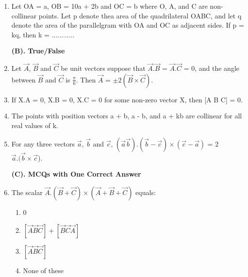 \begin{enumerate}[label=\arabic*.,ref=\thesubsection.\theenumi]
\item Let OA = a, OB = 10a + 2b and OC = b where O, A, and C are non-collinear points. Let p denote thea area of the quadrilateral OABC, and let q denote the area of the parallelgram with OA and OC as adjacent sides. If p = kq, then k = ............

\textbf{(B). True/False}

\item Let $\overrightarrow{A}$, $\overrightarrow{B}$ and $\overrightarrow{C}$ be unit vectors suppose that $\overrightarrow{A}.\overrightarrow{B}$ = $\overrightarrow{A}.\overrightarrow{C}$ = 0, and the angle between $\overrightarrow{B}$ and $\overrightarrow{C}$ is $\frac{\pi}{6}$. Then $\overrightarrow{A}$ = $\pm 2(\overrightarrow{B} \times \overrightarrow{C})$.

\item If X.A = 0, X.B = 0, X.C = 0 for some non-zero vector X, then [A B C] = 0.

\item The points with position vectors a + b, a - b, and a + kb are collinear for all real values of k.

\item For any three vectors $\overrightarrow{a}$, $\overrightarrow{b}$ and $\overrightarrow{c}$, $(\overrightarrow{a}  \overrightarrow{b}) . (\overrightarrow{b} - \overrightarrow{c}) \times (\overrightarrow{c} - \overrightarrow{a})$ = 2$\overrightarrow{a} . (\overrightarrow{b} \times \overrightarrow{c}$).

\textbf{(C). MCQs with One Correct Answer}
\item The scalar $\overrightarrow{A} . (\overrightarrow{B} + \overrightarrow{C}) \times (\overrightarrow{A} + \overrightarrow{B} + \overrightarrow{C})$ equals:
\begin{enumerate}
\item 0
\item $[\overrightarrow{A}  \overrightarrow{B}  \overrightarrow{C}] + [\overrightarrow{B} \overrightarrow{C} \overrightarrow{A}]$
\item $[\overrightarrow{A} \overrightarrow{B} \overrightarrow{C}]$
\item None of these
\end{enumerate}


\end{enumerate}
